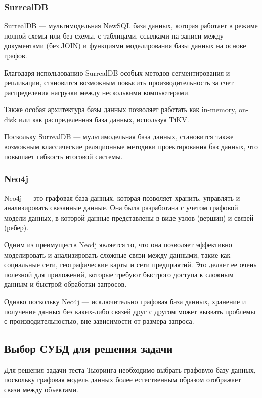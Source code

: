 \subsubsection{SurrealDB}

SurrealDB --- мультимодельная NewSQL база данных, которая работает в режиме полной схемы или без схемы, с таблицами, ссылками на записи между документами (без JOIN) и функциями моделирования базы данных на основе графов.

Благодаря использованию SurrealDB особых методов сегментирования и репликации, становится возможным повысить производительность за счет распределения нагрузки между несколькими компьютерами.

Также особая архитектура базы данных позволяет работать как in-memory, on-disk или как распределенная база данных, используя TiKV.

Поскольку SurrealDB --- мультимодельная база данных, становится также возможным классические реляционные методики проектирования баз данных, что повышает гибкость итоговой системы.

\subsubsection{Neo4j}

Neo4j --- это графовая база данных, которая позволяет хранить, управлять и анализировать связанные данные. Она была разработана с учетом графовой модели данных, в которой данные представлены в виде узлов (вершин) и связей (ребер). 

Одним из преимуществ Neo4j является то, что она позволяет эффективно моделировать и анализировать сложные связи между данными, такие как социальные сети, географические карты и сети предприятий. Это делает ее очень полезной для приложений, которые требуют быстрого доступа к сложным данным и быстрой обработки запросов.

Однако поскольку Neo4j ---  исключительно графовая база данных, хранение и получение данных без каких-либо связей друг с другом может вызвать проблемы с производительностью, вне зависимости от размера запроса.

\subsection{Выбор СУБД для решения задачи}

Для решения задачи теста Тьюринга необходимо выбрать графовую базу данных, поскольку графовая модель данных более естественным образом отображает связи между объектами. 

